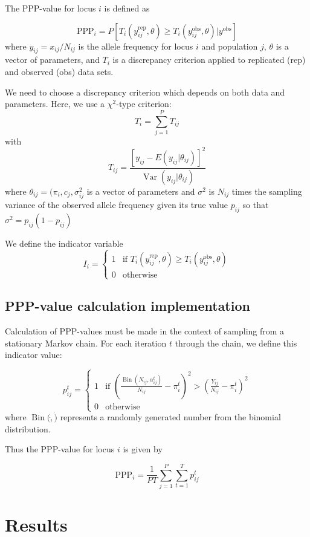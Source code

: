 \documentclass[a4paper,12pt]{article}
\begin{document}
The PPP-value for locus $i$ is defined as

$$\text{PPP}_i = 
P\left[T_i(y_{ij}^{\text{rep}},\theta)\geq T_i(y_{ij}^{\text{obs}},\theta)|y^{\text{obs}}\right]
$$
where $y_{ij}=x_{ij}/N_{ij}$ is the allele frequency for locus $i$ and
population $j$, $\theta$ is a vector of parameters, and $T_i$ is a
discrepancy criterion applied to replicated (rep) and observed (obs)
data sets.

We need to choose a discrepancy criterion which depends on both data
and parameters. Here, we use a $\chi^2$-type criterion:
$$T_i = \sum_{j=1}^P T_{ij}$$
with
$$T_{ij} = 
\frac{\left[y_{ij} - E(y_{ij}|\theta_{ij})\right]^2}{
  \operatorname{Var}(y_{ij}|\theta_{ij})}$$ where
$\theta_{ij}=(\pi_i,c_j,\sigma_{ij}^2$ is a vector of parameters and $\sigma^2$ is $N_{ij}$ times the sampling variance of the observed allele frequency given its true value $p_{ij}$ so that
$\sigma^2=p_{ij}(1-p_{ij})$

We define the indicator variable
$$
I_i =
\begin{cases}
  1 & \text{if }T_i(y_{ij}^{\text{rep}},\theta)\geq T_i(y_{ij}^{\text{obs}},\theta) \\
  0 & \text{otherwise}
\end{cases}
$$

\subsection{PPP-value calculation implementation}

Calculation of PPP-values must be made in the context of sampling from
a stationary Markov chain. For each iteration $t$ through the chain,
we define this indicator value:

$$
p_{ij}^t =
\begin{cases} 
1 & \text{if }\left(
\frac{\operatorname{Bin}(N_{ij},\alpha_{ij}^t)}{N_{ij}} - \pi_i^t
\right)^2
>
\left(
\frac{Y_{ij}}{N_{ij}} - \pi_i^t
\right)^2\\
0 & \text{otherwise}
\end{cases}
$$
where $\operatorname{Bin}(\dot,\dot)$ represents a randomly generated
number from the binomial distribution.

Thus the PPP-value for locus $i$ is given by

$$
\text{PPP}_i = \frac 1 {PT} \sum_{j=1}^P \sum_{t=1}^T p_{ij}^t
$$

\section{Results}
\end{document}
